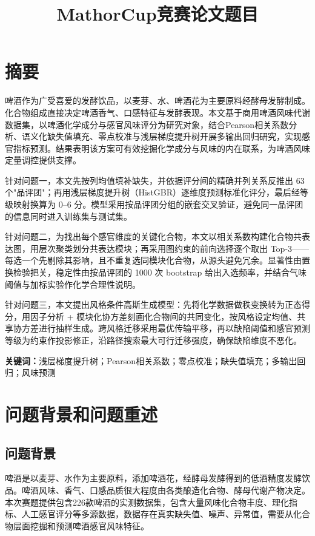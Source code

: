 \documentclass[12pt,a4paper]{article}
\begin{document}
\title{MathorCup竞赛论文题目}
\author{}
\date{}
\maketitle

\section*{摘要}

啤酒作为广受喜爱的发酵饮品，以麦芽、水、啤酒花为主要原料经酵母发酵制成。化合物组成直接决定啤酒香气、口感特征与发酵表现。本文基于商用啤酒风味代谢数据集，以啤酒化学成分与感官风味评分为研究对象，结合Pearson相关系数分析、语义化缺失值填充、零点校准与浅层梯度提升树开展多输出回归研究，实现感官指标预测。结果表明该方案可有效挖掘化学成分与风味的内在联系，为啤酒风味定量调控提供支撑。

针对问题一，本文先按列均值填补缺失，并依据评分间的精确并列关系反推出 63 个"品评团"；再用浅层梯度提升树（HistGBR）逐维度预测标准化评分，最后经等级映射换算为 0–6 分。模型采用按品评团分组的嵌套交叉验证，避免同一品评团的信息同时进入训练集与测试集。

针对问题二，为找出每个感官维度的关键化合物，本文以相关系数构建化合物共表达图，用层次聚类划分共表达模块；再采用图约束的前向选择逐个取出 Top-3——每选一个先剔除其影响，且不重复选同模块化合物，从源头避免冗余。显著性由置换检验把关，稳定性由按品评团的 1000 次 bootstrap 给出入选频率，并结合气味阈值与加标实验作化学合理性说明。

针对问题三，本文提出风格条件高斯生成模型：先将化学数据做秩变换转为正态得分，用因子分析 + 模块化协方差刻画化合物间的共同变化，按风格设定均值、共享协方差进行抽样生成。跨风格迁移采用最优传输平移，再以缺陷阈值和感官预测等级为约束作投影修正，沿路径搜索最大可行迁移强度，确保缺陷维度不恶化。

\textbf{关键词：}浅层梯度提升树；Pearson相关系数；零点校准；缺失值填充；多输出回归；风味预测
\tableofcontents
\newpage
\section{问题背景和问题重述}
\subsection{问题背景}
啤酒是以麦芽、水作为主要原料，添加啤酒花，经酵母发酵得到的低酒精度发酵饮品。啤酒风味、香气、口感品质很大程度由各类酿造化合物、酵母代谢产物决定。本次赛题提供包含226款啤酒的实测数据集，包含大量风味化合物丰度、理化指标、人工感官评分等多源数据，数据存在真实缺失值、噪声、异常值，需要从化合物层面挖掘和预测啤酒感官风味特征。
\end{document}
